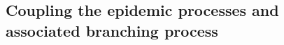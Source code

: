 \documentclass{article}
\theoremstyle{definition}
\begin{document}
 

 
 




    

   
\subsection{Coupling the epidemic processes  and associated branching process}
\label{coupling_defined}
\end{document}
